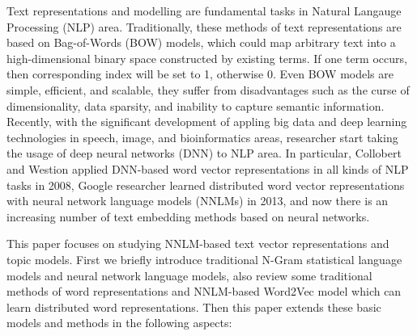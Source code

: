 \documentclass[master]{njuthesis}
\begin{document}
\begin{englishabstract}

Text representations and modelling are fundamental tasks in Natural Langauge Processing (NLP) area. Traditionally, these methods of text representations are based on Bag-of-Words (BOW) models, which could map arbitrary text into a high-dimensional binary space constructed by existing terms. If one term occurs, then corresponding index will be set to 1, otherwise 0. Even BOW models are simple, efficient, and scalable, they suffer from disadvantages such as the curse of dimensionality, data sparsity, and inability to capture semantic information. Recently, with the significant development of appling big data and deep learning technologies in speech, image, and bioinformatics areas, researcher start taking the usage of deep neural networks (DNN) to NLP area. In particular, Collobert and Westion applied DNN-based word vector representations in all kinds of NLP tasks in 2008, Google researcher learned distributed word vector representations with neural network language models (NNLMs) in 2013, and now there is an increasing number of  text embedding methods based on neural networks.

This paper focuses on studying NNLM-based text vector representations and topic models. First we briefly introduce traditional N-Gram statistical language models and neural network language models, also review some traditional methods of word representations and NNLM-based Word2Vec model which can learn distributed word representations. Then this paper extends these basic models and methods in the following aspects:


\end{englishabstract}
\end{document}
